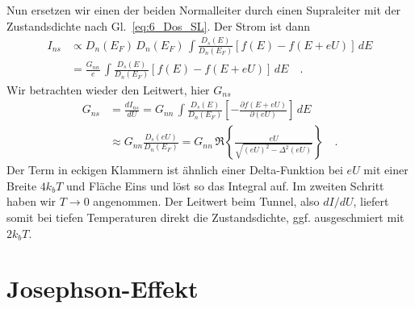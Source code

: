 Nun ersetzen  wir einen der beiden Normalleiter durch einen Supraleiter mit der Zustandsdichte nach 
Gl.~\ref{eq:6_Dos_SL}. Der Strom ist dann 
\begin{align}
    I_{ns} &\propto D_n(E_F) \, D_{n}(E_F)  \, \int  \frac{D_s(E)}{D_n(E_F)} [f(E) - f(E + e U)] \, dE \\
      & = \frac{ G_{nn}}{e} \, \int  \frac{D_s(E)}{D_n(E_F)} [f(E) - f(E + e U)] \, dE  \quad .
\end{align}
Wir betrachten  wieder den Leitwert, hier $G_{ns}$ 
\begin{align}
    G_{ns} & = \frac{d I_{ns}}{d U} =  G_{nn} \, \int  \frac{D_s(E)}{D_n(E_F)} 
    \left[ - \frac{\partial f(E+ eU)}{\partial (eU)} \right] \, dE  \\
      & \approx   G_{nn} \frac{D_s(eU)}{D_n(E_F)}  =  
      G_{nn} \, \Re \left\{ \frac{eU}{\sqrt{ (eU)^2 - \Delta^2(eU)}} \right\} \quad .
\end{align}
Der Term in eckigen Klammern ist ähnlich einer Delta-Funktion bei $eU$ mit einer Breite $4 k_b T$ und Fläche Eins und löst so das Integral auf. Im zweiten Schritt haben wir $T \rightarrow 0$ angenommen. Der Leitwert beim Tunnel, also $dI/dU$, liefert somit bei tiefen Temperaturen direkt die Zustandsdichte, ggf. ausgeschmiert mit $2 k_b T$.


\section*{Josephson-Effekt}


